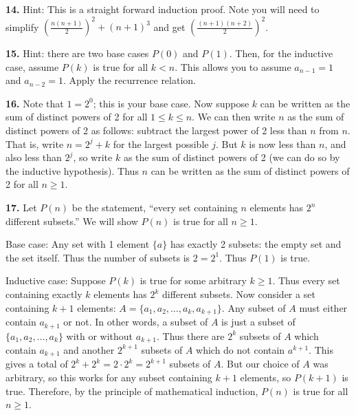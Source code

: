 \documentclass[10pt,]{book}
\theoremstyle{plain}
\theoremstyle{definition}
\theoremstyle{definition}
\theoremstyle{definition}
\numberwithin{equation}{chapter}
\newcommand{\lt}{ < }
\begin{document}
\par\smallskip
\noindent\textbf{14.}\quad{}
            Hint: This is a straight forward induction proof. Note you will need to simplify \(\left(\frac{n(n+1)}{2}\right)^2 + (n+1)^3\) and get \(\left(\frac{(n+1)(n+2)}{2}\right)^2\).
\par\smallskip
\noindent\textbf{15.}\quad{}
            Hint: there are two base cases \(P(0)\) and \(P(1)\). Then, for the inductive case, assume \(P(k)\) is true for all \(k \lt  n\). This allows you to assume \(a_{n-1} = 1\) and \(a_{n-2} = 1\). Apply the recurrence relation.
\par\smallskip
\noindent\textbf{16.}\quad{}
            Note that \(1 = 2^0\); this is your base case. Now suppose \(k\) can be written as the sum of distinct powers of 2 for all \(1\le k \le n\). We can then write \(n\) as the sum of distinct powers of 2 as follows: subtract the largest power of 2 less than \(n\) from \(n\). That is, write \(n = 2^j + k\) for the largest possible \(j\). But \(k\) is now less than \(n\), and also less than \(2^j\), so write \(k\) as the sum of distinct powers of 2 (we can do so by the inductive hypothesis). Thus \(n\) can be written as the sum of distinct powers of 2 for all \(n \ge 1\).
\par\smallskip
\noindent\textbf{17.}\quad{}
            Let \(P(n)\) be the statement, ``every set containing \(n\) elements has \(2^n\) different subsets.'' We will show \(P(n)\) is true for all \(n \ge 1\).

            Base case: Any set with 1 element \(\{a\}\) has exactly 2 subsets: the empty set and the set itself. Thus the number of subsets is \(2= 2^1\). Thus \(P(1)\) is true.

            Inductive case: Suppose \(P(k)\) is true for some arbitrary \(k \ge 1\). Thus every set containing exactly \(k\) elements has \(2^k\) different subsets. Now consider a set containing \(k+1\) elements: \(A = \{a_1, a_2, \ldots, a_k, a_{k+1}\}\). Any subset of \(A\) must either contain \(a_{k+1}\) or not. In other words, a subset of \(A\) is just a subset of \(\{a_1, a_2,\ldots, a_k\}\) with or without \(a_{k+1}\). Thus there are \(2^k\) subsets of \(A\) which contain \(a_{k+1}\) and another \(2^{k+1}\) subsets of \(A\) which do not contain \(a^{k+1}\). This gives a total of \(2^k + 2^k = 2\cdot 2^k = 2^{k+1}\) subsets of \(A\). But our choice of \(A\) was arbitrary, so this works for any subset containing \(k+1\) elements, so \(P(k+1)\) is true. Therefore, by the principle of mathematical induction, \(P(n)\) is true for all \(n \ge 1\).
\par\smallskip
\end{document}
